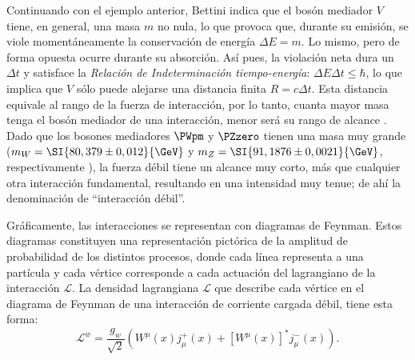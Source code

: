 Continuando con el ejemplo anterior, Bettini indica que el bosón mediador $V$ tiene, en general, una masa $m$ no nula, lo que provoca que, durante su emisión, se viole momentáneamente la conservación de energía $\Delta E = m$. Lo mismo, pero de forma opuesta ocurre durante su absorción. Así pues, la violación neta dura un $\Delta t$ y satisface la \textit{Relación de Indeterminación tiempo-energía}: $\Delta E \Delta t \leq \hbar$, lo que implica que $V$ sólo puede alejarse una distancia finita $R=c\Delta t$. Esta distancia equivale al rango de la fuerza de interacción, por lo tanto, cuanta mayor masa tenga el bosón mediador de una interacción, menor será su rango de alcance \cite{Bettini}. Dado que los bosones mediadores $\PWpm$ y $\PZzero$ tienen una masa muy grande ($m_W = \SI{80,379 \pm 0,012}{\GeV}$ y $m_Z = \SI{91,1876 \pm 0,0021}{\GeV}$, respectivamente \cite{Zyla}), la fuerza débil tiene un alcance muy corto, más que cualquier otra interacción fundamental, resultando en una intensidad muy tenue; de ahí la denominación de ``interacción débil''. 

Gráficamente, las interacciones se representan con diagramas de Feynman. Estos diagramas constituyen una representación pictórica de la amplitud de probabilidad de los distintos procesos, donde cada línea representa a una partícula y cada vértice corresponde a cada actuación del lagrangiano de la interacción $\mathcal{L}$. La densidad lagrangiana $\mathcal{L}$ que describe cada vértice en el diagrama de Feynman de una interacción de corriente cargada débil, tiene esta forma:
\begin{equation}
\mathcal{L}^{w}=\dfrac{g_{w}}{\sqrt{2}}\left( W^{\mu }\left( x\right) j_{\mu}^{+}\left( x\right) +\left[ W^{\mu }\left( x\right) \right]^{\ast }j_{\mu}^{-}\left( x\right) \right) .\label{eq:weak_lagrangian}
\end{equation}

